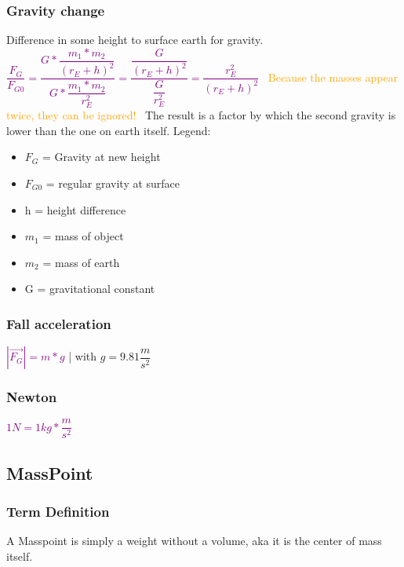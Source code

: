 \documentclass[main.tex,fontsize=8pt,paper=a4,paper=portrait,DIV=calc,]{scrartcl}
\begin{document}
\begin{multicols*}{2}
\subsubsection{Gravity change}
Difference in some height to surface earth for gravity.\newline
\, \newline
\large \textcolor{purple}{\( \dfrac{F_G}{F_{G0}} = \dfrac{G*\dfrac{m_1 * m_2}{(r_E + h)^2}}{G*\dfrac{m_1 * m_2}{r_E^2}} = \dfrac{\dfrac{G}{(r_E + h)^2}}{\dfrac{G}{r_E^2}}  = \dfrac{r_E^2}{(r_E + h)^2} \)}\newline
\, \newline
\textcolor{orange}{Because the masses appear twice, they can be ignored!}\newline
\, \newline
\normalsize The result is a factor by which the second gravity is lower than the one on earth itself.\newline
Legend: \newline
\begin{itemize}
  \item \(F_G\) = Gravity at new height
  \item \(F_{G0}\) = regular gravity at surface
\item h = height difference
\item \(m_1\) = mass of object 
\item \(m_2\) = mass of earth 
\item G = gravitational constant
\end{itemize} 

\subsubsection{Fall acceleration}
\textcolor{purple}{\(|\vec{F_G}| = m * g\)} | with \(g = 9.81\dfrac{m}{s^2}\)

\subsubsection{Newton}
\textcolor{purple}{\(1N = 1kg * \dfrac{m}{s^2}\)}\vspace{2mm}

\subsection{MassPoint}
\subsubsection{Term Definition} 
A Masspoint is simply a weight without a volume, aka it is the center of mass itself.


\end{multicols*}
\end{document}
